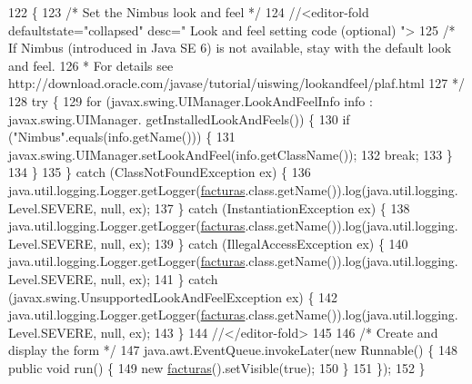 \begin{DoxyCode}
122                                            \{
123         \textcolor{comment}{/* Set the Nimbus look and feel */}
124         \textcolor{comment}{//<editor-fold defaultstate="collapsed" desc=" Look and feel setting code (optional) ">}
125         \textcolor{comment}{/* If Nimbus (introduced in Java SE 6) is not available, stay with the default look and feel.}
126 \textcolor{comment}{         * For details see http://download.oracle.com/javase/tutorial/uiswing/lookandfeel/plaf.html }
127 \textcolor{comment}{         */}
128         \textcolor{keywordflow}{try} \{
129             \textcolor{keywordflow}{for} (javax.swing.UIManager.LookAndFeelInfo info : javax.swing.UIManager.
      getInstalledLookAndFeels()) \{
130                 \textcolor{keywordflow}{if} (\textcolor{stringliteral}{"Nimbus"}.equals(info.getName())) \{
131                     javax.swing.UIManager.setLookAndFeel(info.getClassName());
132                     \textcolor{keywordflow}{break};
133                 \}
134             \}
135         \} \textcolor{keywordflow}{catch} (ClassNotFoundException ex) \{
136             java.util.logging.Logger.getLogger(\mbox{\hyperlink{class_interfaz_package_1_1facturas_a14c886b63fc2b58e9f9b6697daa99c6b}{facturas}}.class.getName()).log(java.util.logging.
      Level.SEVERE, null, ex);
137         \} \textcolor{keywordflow}{catch} (InstantiationException ex) \{
138             java.util.logging.Logger.getLogger(\mbox{\hyperlink{class_interfaz_package_1_1facturas_a14c886b63fc2b58e9f9b6697daa99c6b}{facturas}}.class.getName()).log(java.util.logging.
      Level.SEVERE, null, ex);
139         \} \textcolor{keywordflow}{catch} (IllegalAccessException ex) \{
140             java.util.logging.Logger.getLogger(\mbox{\hyperlink{class_interfaz_package_1_1facturas_a14c886b63fc2b58e9f9b6697daa99c6b}{facturas}}.class.getName()).log(java.util.logging.
      Level.SEVERE, null, ex);
141         \} \textcolor{keywordflow}{catch} (javax.swing.UnsupportedLookAndFeelException ex) \{
142             java.util.logging.Logger.getLogger(\mbox{\hyperlink{class_interfaz_package_1_1facturas_a14c886b63fc2b58e9f9b6697daa99c6b}{facturas}}.class.getName()).log(java.util.logging.
      Level.SEVERE, null, ex);
143         \}
144         \textcolor{comment}{//</editor-fold>}
145 
146         \textcolor{comment}{/* Create and display the form */}
147         java.awt.EventQueue.invokeLater(\textcolor{keyword}{new} Runnable() \{
148             \textcolor{keyword}{public} \textcolor{keywordtype}{void} run() \{
149                 \textcolor{keyword}{new} \mbox{\hyperlink{class_interfaz_package_1_1facturas_a14c886b63fc2b58e9f9b6697daa99c6b}{facturas}}().setVisible(\textcolor{keyword}{true});
150             \}
151         \});
152     \}
\end{DoxyCode}


